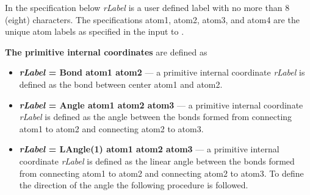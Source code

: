 In the specification below {\em rLabel} is a user defined label with no more
than 8 (eight) characters. The specifications atom1, atom2, atom3, and atom4
are the unique atom labels as specified in the input to .

{\bf The primitive internal coordinates} are defined as

\begin{itemize}
\item
{\bf {\em rLabel} = Bond atom1 atom2 }---
a primitive internal coordinate {\em rLabel} is defined as the bond
between center atom1 and atom2.
\item
{\bf {\em rLabel} = Angle atom1 atom2 atom3} ---
a primitive internal coordinate {\em rLabel} is defined as the angle
between the bonds formed from connecting atom1 to atom2 and
connecting atom2 to atom3.
\item
{\bf {\em rLabel} = LAngle(1) atom1 atom2 atom3} ---
a primitive internal coordinate {\em rLabel} is defined as the linear angle
between the bonds formed from connecting atom1 to atom2 and
connecting atom2 to atom3. To define the direction of the angle the following
procedure is followed.


\end{itemize}
